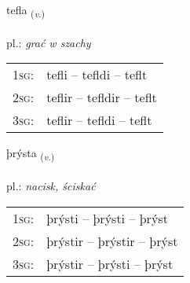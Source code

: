 \documentclass[frontgrid, backgrid]{flacards}\usepackage[]{graphicx}\usepackage[]{xcolor}
\begin{document}
\renewcommand{\flhead}{\vskip5pt \fboxsep=0pt {\small\bfseries\footnotesize Sagnorð | czasownik}}
\renewcommand{\fcfoot}{\vskip5pt \fboxsep=0pt \hspace{2pt}{\small\bfseries\footnotesize 3K}}

\renewcommand{\blhead}{\vskip5pt {\small\bfseries\footnotesize Sagnorð | czasownik }}
\renewcommand{\bcfoot}{\vskip5pt \hspace{2pt}{\small\bfseries\footnotesize 3K}}


{tefla \small{\textsubscript{(\textit{v.})}} \\[1ex] %
\textphonetic{[tʰɛpla]} \\
pl.: \emph{grać w szachy} \\  [2ex]
\renewcommand*{\arraystretch}{0.8}
\begin{tabular}{p{1cm}l}
\textsc{1sg}: & tefli -- tefldi -- teflt \\ 
\textsc{2sg}: & teflir -- tefldir -- teflt \\ 
\textsc{3sg}: & teflir -- tefldi -- teflt \\ 
\end{tabular}
}

\renewcommand{\flhead}{\vskip5pt \fboxsep=0pt {\small\bfseries\footnotesize Sagnorð | czasownik}}
\renewcommand{\fcfoot}{\vskip5pt \fboxsep=0pt \hspace{2pt}{\small\bfseries\footnotesize 3K}}

\renewcommand{\blhead}{\vskip5pt {\small\bfseries\footnotesize Sagnorð | czasownik }}
\renewcommand{\bcfoot}{\vskip5pt \hspace{2pt}{\small\bfseries\footnotesize 3K}}


{þrýsta \small{\textsubscript{(\textit{v.})}} \\[1ex] %
\textphonetic{[θrista]} \\
pl.: \emph{nacisk, ściskać} \\  [2ex]
\renewcommand*{\arraystretch}{0.8}
\begin{tabular}{p{1cm}l}
\textsc{1sg}: & þrýsti -- þrýsti -- þrýst \\ 
\textsc{2sg}: & þrýstir -- þrýstir -- þrýst \\ 
\textsc{3sg}: & þrýstir -- þrýsti -- þrýst \\ 
\end{tabular}
}
\end{document}
